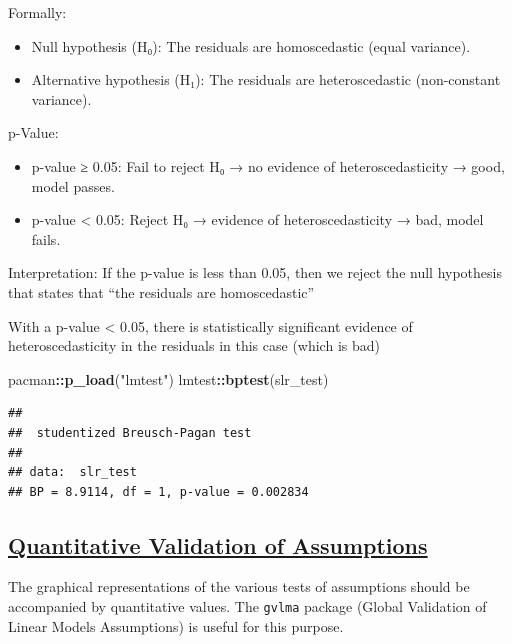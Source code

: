 \documentclass[
]{article}
\newenvironment{Shaded}{\begin{snugshade}}{\end{snugshade}}
\newcommand{\FunctionTok}[1]{\textcolor[rgb]{0.13,0.29,0.53}{\textbf{#1}}}
\newcommand{\NormalTok}[1]{#1}
\newcommand{\SpecialCharTok}[1]{\textcolor[rgb]{0.81,0.36,0.00}{\textbf{#1}}}
\newcommand{\StringTok}[1]{\textcolor[rgb]{0.31,0.60,0.02}{#1}}
\begin{document}
Formally:

\begin{itemize}
\item
  Null hypothesis (H₀): The residuals are homoscedastic (equal
  variance).
\item
  Alternative hypothesis (H₁): The residuals are heteroscedastic
  (non-constant variance).
\end{itemize}

p-Value:

\begin{itemize}
\item
  p-value ≥ 0.05: Fail to reject H₀ → no evidence of heteroscedasticity
  → good, model passes.
\item
  p-value \textless{} 0.05: Reject H₀ → evidence of heteroscedasticity →
  bad, model fails.
\end{itemize}

Interpretation: If the p-value is less than 0.05, then we reject the
null hypothesis that states that ``the residuals are homoscedastic''

With a p-value \textless{} 0.05, there is statistically significant
evidence of heteroscedasticity in the residuals in this case (which is
bad)

\begin{Shaded}
\begin{Highlighting}[]
\NormalTok{pacman}\SpecialCharTok{::}\FunctionTok{p\_load}\NormalTok{(}\StringTok{"lmtest"}\NormalTok{)}
\NormalTok{lmtest}\SpecialCharTok{::}\FunctionTok{bptest}\NormalTok{(slr\_test)}
\end{Highlighting}
\end{Shaded}

\begin{verbatim}
## 
##  studentized Breusch-Pagan test
## 
## data:  slr_test
## BP = 8.9114, df = 1, p-value = 0.002834
\end{verbatim}

\subsection{\texorpdfstring{\ul{\textbf{Quantitative Validation of
Assumptions}}}{Quantitative Validation of Assumptions}}\label{quantitative-validation-of-assumptions}

The graphical representations of the various tests of assumptions should
be accompanied by quantitative values. The \texttt{gvlma} package
(Global Validation of Linear Models Assumptions) is useful for this
purpose.
\end{document}
